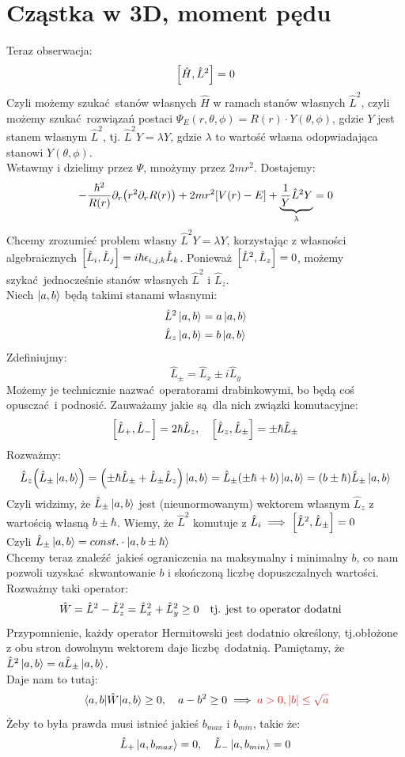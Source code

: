 \documentclass[12pt,a4paper]{report}
\newcommand{\subind}[2]{{\color{blue} #1\index{#2}}}
\newcommand{\pd}[1]{\partial_{#1}}
\newenvironment{lecture}[1]{\par\medskip
   \noindent\chapter{#1} \rmfamily}{\medskip}
\begin{document}
\begin{lecture}{Cząstka w 3D, moment pędu}
Teraz obserwacja:
\[
    \comm{\hat{H}}{\hat{L}^2} = 0
\]
Czyli możemy szukać stanów własnych $\hat{H}$ w ramach stanów własnych $\hat{L}^2$, czyli możemy szukać rozwiązań postaci $\Psi_E(r,\theta,\phi) = R(r)\cdot Y(\theta, \phi)$, gdzie $Y$ jest stanem własnym $\hat{L}^2$, tj. $\hat{L}^2 Y = \lambda Y$, gdzie $\lambda$ to wartość własna odopwiadająca stanowi $Y(\theta, \phi)$.\\
Wstawmy i dzielimy przez $\Psi$, mnożymy przez $2 m r^2$. Dostajemy:
\[
    -\frac{\hbar^2}{R(r)} \pd{r} \qty(r^2\pd{r}R(r)) + 2 m r^2\qty[V(r) - E] + \underbrace{\frac{1}{Y} \hat{L}^2 Y}_{\lambda} = 0
\]
Chcemy zrozumieć problem własny $\hat{L}^2 Y = \lambda Y$, korzystając z własności algebraicznych $\comm{\hat{L}_i}{\hat{L}_j} = i \hbar \epsilon_{i,j,k}\hat{L}_k$. Ponieważ $\comm{\hat{L}^2}{\hat{L}_z} = 0$, możemy szykać jednocześnie stanów własnych $\hat{L}^2$ i $\hat{L}_z$.\\
Niech $\ket{a,b}$ będą takimi stanami własnymi:
\begin{align*}
    \hat{L}^2 \ket{a,b} &= a \ket{a,b}\\
    \hat{L}_z \ket{a,b} &= b \ket{a,b}\\
\end{align*}
Zdefiniujmy:
\[
    \hat{L}_{\pm} = \hat{L}_x \pm i \hat{L}_y
\]
Możemy je technicznie nazwać operatorami drabinkowymi, bo będą coś opusczać i podnosić. Zauważamy jakie są dla nich \subind{związki komutacyjne}{Związek!Komutacyjny}:
\[
    \comm{\hat{L}_{+}}{\hat{L}_{-}} = 2 \hbar \hat{L}_z \qc \comm{\hat{L}_{z}}{\hat{L}_{\pm}} = \pm \hbar\hat{L}_{\pm}
\]
Rozważmy:
\[
    \hat{L}_z \qty(\hat{L}_{\pm}\ket{a,b}) = \qty(\pm \hbar \hat{L}_{\pm} + \hat{L}_{\pm}\hat{L}_z)\ket{a,b} = \hat{L}_{\pm}\qty(\pm\hbar + b)\ket{a,b} = \qty(b \pm \hbar) \hat{L}_{\pm}\ket{a,b}
\]
Czyli widzimy, że $\hat{L}_\pm\ket{a,b}$ jest (nieunormowanym) wektorem własnym $\hat{L}_z$ z wartością własną $b \pm \hbar$. Wiemy, że $\hat{L}^2$ komutuje z $\hat{L}_{i} \implies \comm{\hat{L}^2}{\hat{L}_\pm} = 0$\\
Czyli $\hat{L}_\pm \ket{a,b} = const. \cdot \ket{a,b\pm \hbar}$\\
Chcemy teraz znaleźć jakieś ograniczenia na maksymalny i minimalny $b$, co nam pozwoli uzyskać skwantowanie $b$ i skończoną liczbę dopuszczalnych wartości.\\
Rozważmy taki operator:
\[
    \hat{W} = \hat{L}^2 - \hat{L}_z^2 = \hat{L}_x^2 + \hat{L}_y^2 \geq 0 \qq{tj. jest to operator dodatni}
\]
Przypomnienie, każdy operator Hermitowski jest dodatnio określony, tj.obłożone z obu stron dowolnym wektorem daje liczbę dodatnią. Pamiętamy, że $\hat{L}^2 \ket{a,b} = a \hat{L}_\pm\ket{a,b}$.\\Daje nam to tutaj:
\[
    \mel{a,b}{\hat{W}}{a,b} \geq 0\qc a - b^2 \geq 0 \implies \color{BrickRed} a > 0, \abs{b} \leq \sqrt{a}
\]
Żeby to była prawda musi istnieć jakieś $b_{max}$ i $b_{min}$, takie że:
\[
        \hat{L}_{+} \ket{a, b_{max}} = 0 \qc \hat{L}_{-} \ket{a, b_{min}} = 0 
\]
\end{lecture}
\end{document}
